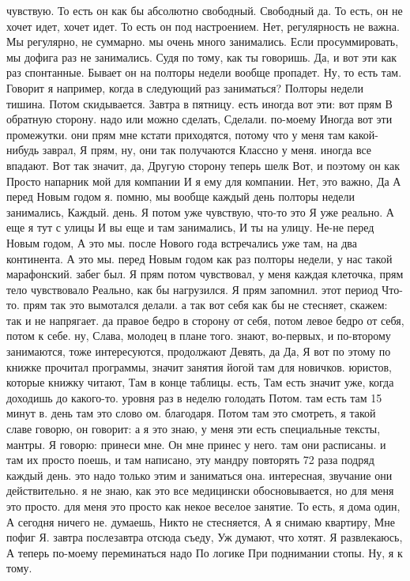 чувствую.
То есть он как бы абсолютно свободный.
Свободный да.
То есть, он не хочет идет, хочет идет.
То есть он под настроением.
Нет, регулярность не важна.
Мы регулярно, не суммарно. мы очень много занимались.
Если просуммировать, мы дофига раз не занимались.
Судя по тому, как ты говоришь.
Да, и вот эти как раз спонтанные.
Бывает он на полторы недели вообще пропадет.
Ну, то есть там.
Говорит я например, когда в следующий раз заниматься?
Полторы недели тишина.
Потом скидывается.
Завтра в пятницу.
есть иногда вот эти:
вот прям В обратную сторону. надо или можно сделать, Сделали.
по-моему Иногда вот эти промежутки.
они прям мне кстати приходятся, потому что у меня там какой-нибудь заврал, Я прям, ну, они так получаются Классно у меня.
иногда все впадают. Вот так значит, да, Другую сторону теперь шелк Вот, и поэтому он как Просто напарник мой для компании И я ему для компании.
Нет, это важно, Да А перед Новым годом я.
помню, мы вообще каждый день полторы недели занимались, Каждый.
день. Я потом уже чувствую, что-то это Я уже реально. А еще я тут с улицы И вы еще и там занимались, И ты на улицу.
Не-не перед Новым годом, А это мы. после Нового года встречались уже там, на два континента. А это мы.
перед Новым годом как раз полторы недели, у нас такой марафонский.
забег был. Я прям потом чувствовал, у меня каждая клеточка, прям тело чувствовало Реально, как бы нагрузился. Я прям запомнил.
этот период Что-то.
прям так это вымотался делали.
а так вот себя как бы не стесняет, скажем:
так и не напрягает. да правое бедро в сторону от себя, потом левое бедро от себя, потом к себе. ну, Слава, молодец в плане того.
знают, во-первых, и по-второму занимаются, тоже интересуются, продолжают Девять, да Да, Я вот по этому по книжке прочитал программы, значит занятия йогой там для новичков.
юристов, которые книжку читают, Там в конце таблицы.
есть, Там есть значит уже, когда доходишь до какого-то.
уровня раз в неделю голодать Потом.
там есть там 15 минут в.
день там это слово ом.
благодаря.
Потом там это смотреть, я такой славе говорю, он говорит: а я это знаю, у меня эти есть специальные тексты, мантры.
Я говорю: принеси мне.
Он мне принес у него. там они расписаны.
и там их просто поешь, и там написано, эту мандру повторять 72 раза подряд каждый день. это надо только этим и заниматься она. интересная, звучание они действительно. я не знаю, как это все медицински обосновывается, но для меня это просто.
для меня это просто как некое веселое занятие. То есть, я дома один,
А сегодня ничего не.
думаешь, Никто не стесняется, А я снимаю квартиру, Мне пофиг Я.
завтра послезавтра отсюда съеду, Уж думают, что хотят. Я развлекаюсь, А теперь по-моему переминаться надо По логике При поднимании стопы. Ну, я к тому.
